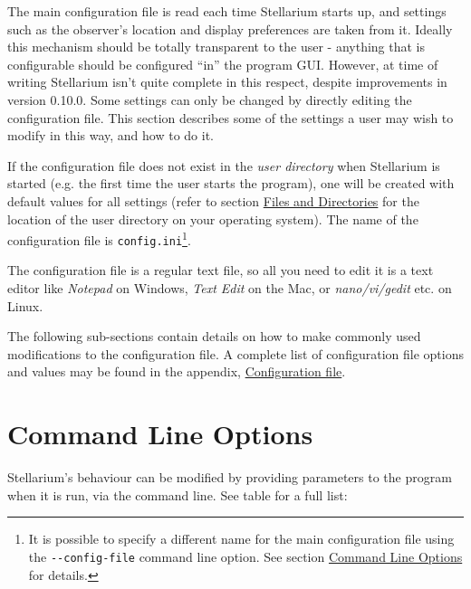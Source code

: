 The main configuration file is read each time Stellarium starts up, and
settings such as the observer's location and display preferences are
taken from it. Ideally this mechanism should be totally transparent to
the user - anything that is configurable should be configured ``in'' the
program GUI. However, at time of writing Stellarium isn't quite complete
in this respect, despite improvements in version 0.10.0. Some settings
can only be changed by directly editing the configuration file. This
section describes some of the settings a user may wish to modify in this
way, and how to do it.

If the configuration file does not exist in the \emph{user directory}
when Stellarium is started (e.g. the first time the user starts the
program), one will be created with default values for all settings
(refer to section \href{Advanced_Use\#Files_and_Directories}{Files and
Directories} for the location of the user directory on your operating
system). The name of the configuration file is
\texttt{config.ini}\footnote{It is possible to specify a different name
  for the main configuration file using the \texttt{-\/-config-file}
  command line option. See section
  \href{Advanced_Use\#Command_Line_Options}{Command Line Options} for
  details.}.

The configuration file is a regular text file, so all you need to edit
it is a text editor like \emph{Notepad} on Windows, \emph{Text Edit} on
the Mac, or \emph{nano/vi/gedit} etc. on Linux.

The following sub-sections contain details on how to make commonly used
modifications to the configuration file. A complete list of
configuration file options and values may be found in the appendix,
\href{Configuration_file}{Configuration file}.

\section{Command Line Options}\label{command-line-options}

Stellarium's behaviour can be modified by providing parameters to the
program when it is run, via the command line. See table for a full list:

